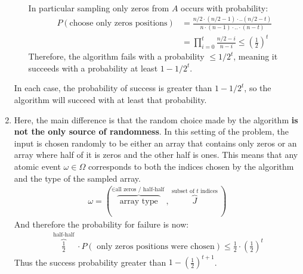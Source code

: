 \begin{enumerate}
\begin{itemize}
\begin{equation*}
\begin{split}
            \end{split}
          \end{equation*}
          In particular sampling only zeros from $A$ occurs with probability: 
          \begin{equation*}
            \begin{split}
               P(\text{choose only zeros positions}  ) & =  \frac{ n/2 \cdot (n/2 -1 ) \cdot .. (n/2-t)}{ n \cdot (n-1) \cdot .. \cdot (n-t)} \\ 
              & = \prod_{i=0}^{t}\frac{n/2 -i}{n - i} \le \left(\frac{1}{2}\right)^{t} 
            \end{split}
          \end{equation*}
          Therefore, the algorithm fails with a probability  $\leq 1/2^{t}$, meaning it succeeds with a probability at least $1 - 1/2^{t}$.
      \end{itemize}
     In each case, the probability of success is greater than $1 - 1/2^{t}$, so the algorithm will succeed with at least that probability.
   \item Here, the main difference is that the random choice made by the algorithm \textbf{is not the only source of randomness}. In this setting of the problem, the input is chosen randomly to be either an array that contains only zeros or an array where half of it is zeros and the other half is ones. This means that any atomic event $\omega \in \Omega$ corresponds to both the indices chosen by the algorithm and the type of the sampled array.
     \begin{equation*}
       \begin{split}
         \omega = \left( \overbrace{ \text{ array type  } }^{ \in \text{all zeros / half-half }} , \overbrace{J}^{ \text{ subset of } t \text{ indices } }\right)
       \end{split}
     \end{equation*}
And therefore the probability for failure is now:
\begin{equation*}
  \begin{split}
    \overbrace{\frac{1}{2}}^{ \text{ half-half } } \cdot P\left( \text{ only zeros positions were chosen} \right) \le \frac{1}{2} \cdot \left( \frac{1}{2} \right)^{t}
  \end{split}
\end{equation*}
Thus the success probability greater than $1 - \left(\frac{1}{2}\right)^{t+1}$. 
  \end{enumerate}
\fi 



